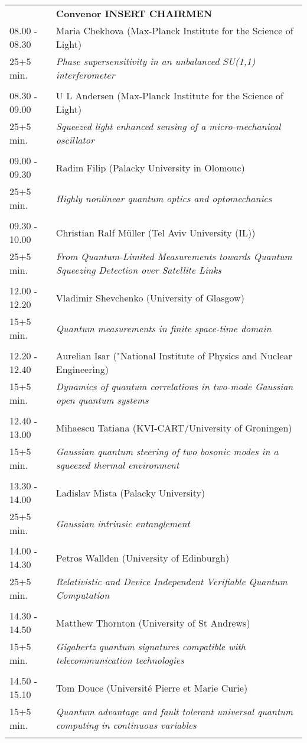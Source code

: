\begin{longtable}{p{3cm}p{13cm}}
&\hfill {\bf Convenor INSERT CHAIRMEN }\\ 
08.00 - 08.30 & Maria Chekhova (Max-Planck Institute for the Science of Light)\\ 
25+5 min. & {\it Phase supersensitivity in an unbalanced SU(1,1) interferometer}\\ 
 & \\ 
08.30 - 09.00 & U L Andersen (Max-Planck Institute for the Science of Light)\\ 
25+5 min. & {\it Squeezed light enhanced sensing of a micro-mechanical oscillator}\\ 
 & \\ 
09.00 - 09.30 & Radim Filip (Palacky University in Olomouc)\\ 
25+5 min. & {\it Highly nonlinear quantum optics and optomechanics}\\ 
 & \\ 
09.30 - 10.00 & Christian Ralf Müller (Tel Aviv University (IL))\\ 
25+5 min. & {\it From Quantum-Limited Measurements towards Quantum Squeezing Detection over Satellite Links}\\ 
 & \\ 
12.00 - 12.20 & Vladimir Shevchenko (University of Glasgow)\\ 
15+5 min. & {\it Quantum measurements in finite space-time domain}\\ 
 & \\ 
12.20 - 12.40 & Aurelian Isar ("National Institute of Physics and Nuclear Engineering)\\ 
15+5 min. & {\it Dynamics of quantum correlations in two-mode Gaussian open quantum systems}\\ 
 & \\ 
12.40 - 13.00 & Mihaescu Tatiana (KVI-CART/University of Groningen)\\ 
15+5 min. & {\it Gaussian quantum steering of two bosonic modes in a squeezed thermal environment}\\ 
 & \\ 
13.30 - 14.00 & Ladislav Mista (Palacky University)\\ 
25+5 min. & {\it Gaussian intrinsic entanglement}\\ 
 & \\ 
14.00 - 14.30 & Petros Wallden (University of Edinburgh)\\ 
25+5 min. & {\it Relativistic and Device Independent Verifiable Quantum Computation}\\ 
 & \\ 
14.30 - 14.50 & Matthew Thornton (University of St Andrews)\\ 
15+5 min. & {\it Gigahertz quantum signatures compatible with telecommunication technologies}\\ 
 & \\ 
14.50 - 15.10 & Tom Douce (Université Pierre et Marie Curie)\\ 
15+5 min. & {\it Quantum advantage and fault tolerant universal quantum computing in continuous variables}\\ 
 & \\ 
\end{longtable}

